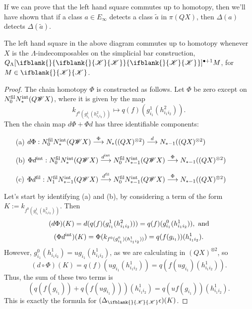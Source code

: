 \documentclass[10pt]{article}
\newcommand{\LL}[1]{\ifblank{#1}{\scrK}{\scrK^{#1}}}
\newcommand{\Fr}[2][]{\ifblank{#1}{#2}{#2_{#1}}}
\renewcommand{\Q}{Q}
\begin{document}
\begin{backgroundOnMultiplicativity}
If we can prove that the left hand square commutes up to homotopy, then we'll have shown that if a class $a\in E_{\infty}$ detects a class $\widetilde{a}$ in $\pi(QX)$, then $\Delta(a)$ detects $\Delta(\widetilde{a})$.
\begin{prop}
The left hand square in the above diagram commutes up to homotopy whenever $X$ is the $\Lambda$-indecomposables on the simplicial bar construction, $\Q_{\Lambda}[\Fr{\LL{}}]^{\bullet+1}M$, for $M\in\LL{}$.
\end{prop}
\begin{proof}
The chain homotopy $\Phi$ is constructed as follows. Let $\Phi$ be zero except on $N_0^\textup{fil}N_*^\textup{int}(Q\scrW X)$, where it is given by the map
\[k_{f^0(g^1_{i_1}(h^2_{i_1i_2}))}\mapsto q(f)(g^1_{i_1}(h^2_{i_1i_2})).\]
Then the chain map $d\Phi+\Phi d$ has three identifiable components:
\begin{enumerate}\squishlist
\setlength{\parindent}{.25in}
\item[(a)] $d\circ\Phi:N_0^\textup{fil}N_*^\textup{int}(Q\scrW X)\overset{\Phi}{\to} N_*((QX)^{\otimes2})\overset{d}{\to} N_{*-1}((QX)^{\otimes2})$
\item[(b)] $\Phi\circ d^\textup{int}:N_0^\textup{fil}N_{*}^\textup{int}(Q\scrW X)\overset{d^\textup{int}}{\to} N_0^\textup{fil}N_{*-1}^\textup{int}(Q\scrW X)\overset{\Phi}{\to} N_{*-1}((QX)^{\otimes2})$
\item[(c)] $\Phi\circ d^\textup{fil}:N_1^\textup{fil}N_{*-1}^\textup{int}(Q\scrW X)\overset{d^\textup{fil}}{\to} N_0^\textup{fil}N_{*-1}^\textup{int}(Q\scrW X)\overset{\Phi}{\to} N_{*-1}((QX)^{\otimes2})$
\end{enumerate}
Let's start by identifying (a) and (b), by considering a term of the form $K:=k_{f^0(g^1_{i_1}(h^2_{i_1i_2}))}$. Then
\[(d\circ\Phi)(K)=d( q(f)(g^1_{i_1}(h^2_{i_1i_2})))=q(f)(g^0_{i_1}(h^1_{i_1i_2})),\textup{ and}\]
\[(\Phi\circ d^\textup{int})(K)=\Phi( k_{f^0(g^0_{i_1})(h^1_{i_1i_2}))})=q(f(g_{i_1}))(h^1_{i_1i_2}).\]
However, $g^0_{i_1}(h^1_{i_1i_2})=ug_{i_1}(h^1_{i_1i_2})$, as we are calculating in $(QX)^{\otimes2}$, so
\[(d\circ\Phi)(K)=q(f)(ug_{i_1}(h^1_{i_1i_2}))=q(f(ug_{i_1})(h^1_{i_1i_2})).\]
Thus, the sum of these two terms is
\[\left(q(f(g_{i_1}))+q(f(ug_{i_1}))\right)(h^1_{i_1i_2})=q(uf(g_{i_1}))(h^1_{i_1i_2}).\]
This is exactly the formula for $(\Delta_{\LL{}}\circ\epsilon)(K)$.


\end{proof}
\end{backgroundOnMultiplicativity}
\end{document}
